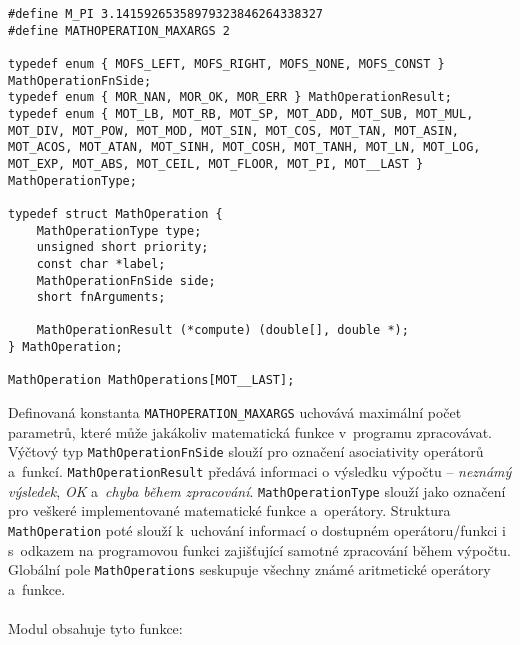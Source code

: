 \documentclass[pdftex,a4paper]{article}
\begin{document}
\begin{lstlisting}
#define M_PI 3.14159265358979323846264338327
#define MATHOPERATION_MAXARGS 2

typedef enum { MOFS_LEFT, MOFS_RIGHT, MOFS_NONE, MOFS_CONST } MathOperationFnSide; 
typedef enum { MOR_NAN, MOR_OK, MOR_ERR } MathOperationResult; 
typedef enum { MOT_LB, MOT_RB, MOT_SP, MOT_ADD, MOT_SUB, MOT_MUL, MOT_DIV, MOT_POW, MOT_MOD, MOT_SIN, MOT_COS, MOT_TAN, MOT_ASIN, MOT_ACOS, MOT_ATAN, MOT_SINH, MOT_COSH, MOT_TANH, MOT_LN, MOT_LOG, MOT_EXP, MOT_ABS, MOT_CEIL, MOT_FLOOR, MOT_PI, MOT__LAST } MathOperationType; 

typedef struct MathOperation {
    MathOperationType type;
    unsigned short priority;
    const char *label;
    MathOperationFnSide side;
    short fnArguments;

    MathOperationResult (*compute) (double[], double *);
} MathOperation;

MathOperation MathOperations[MOT__LAST];
\end{lstlisting}
%
Definovaná konstanta \texttt{MATHOPERATION\_MAXARGS} uchovává maximální počet parametrů, které může jakákoliv matematická funkce v~programu zpracovávat. Výčtový typ \texttt{MathOperationFnSide} slouží pro označení asociativity operátorů a~funkcí. \texttt{MathOperationResult} předává informaci o výsledku výpočtu -- \textit{neznámý výsledek}, \textit{OK} a~\textit{chyba během zpracování}. \texttt{MathOperationType} slouží jako označení pro veškeré implementované matematické funkce a~operátory. Struktura \texttt{MathOperation} poté slouží k~uchování informací o dostupném operátoru/funkci i s~odkazem na programovou funkci zajišťující samotné zpracování během výpočtu. \\Globální pole \texttt{MathOperations} seskupuje všechny známé aritmetické operátory a~funkce.
\\\\
Modul obsahuje tyto funkce:
\end{document}
